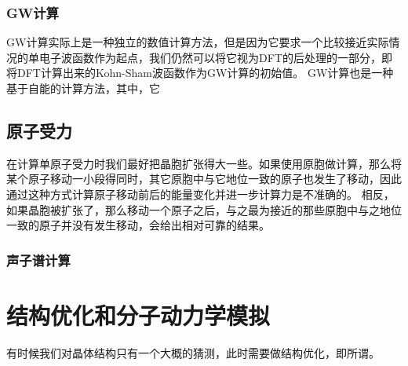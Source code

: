 \subsubsection{GW计算}

GW计算实际上是一种独立的数值计算方法，但是因为它要求一个比较接近实际情况的单电子波函数作为起点，我们仍然可以将它视为DFT的后处理的一部分，即将DFT计算出来的Kohn-Sham波函数作为GW计算的初始值。
GW计算也是一种基于自能的计算方法，其中，它

\subsection{原子受力}



在计算单原子受力时我们最好把晶胞扩张得大一些。如果使用原胞做计算，那么将某个原子移动一小段得同时，其它原胞中与它地位一致的原子也发生了移动，因此通过这种方式计算原子移动前后的能量变化并进一步计算力是不准确的。
相反，如果晶胞被扩张了，那么移动一个原子之后，与之最为接近的那些原胞中与之地位一致的原子并没有发生移动，会给出相对可靠的结果。

\subsubsection{声子谱计算}

\section{结构优化和分子动力学模拟}

有时候我们对晶体结构只有一个大概的猜测，此时需要做结构优化，即所谓。

